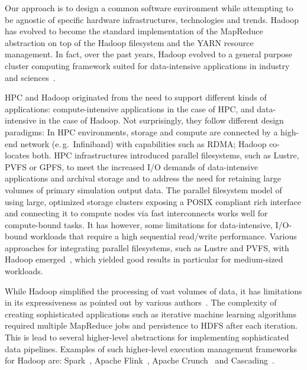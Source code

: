 \label{sec:pilot-data-hadoop}
Our approach is to design a common software environment while attempting to be agnostic of specific hardware infrastructures, technologies and trends.
Hadoop~\cite{hadoop} has evolved to become the standard implementation of the MapReduce abstraction on top of the Hadoop filesystem and the YARN resource management.
In fact, over the past years, Hadoop evolved to a general purpose cluster computing framework suited for data-intensive applications in industry~\cite{luckow2015automotive} and sciences~\cite{jha2014tale}.

HPC and Hadoop originated from the need to support different kinds of applications: compute-intensive applications in the case of HPC, and data-intensive in the case of Hadoop.
Not surprisingly, they follow different design paradigms: In HPC environments, storage and compute are connected by a high-end network (e.\,g.\ Infiniband) with capabilities such as RDMA; Hadoop co-locates both.
HPC infrastructures introduced parallel filesystems, such as Lustre, PVFS or GPFS, to meet the increased I/O demands of data-intensive applications and archival storage and to address the need for retaining large volumes of primary simulation output data.
The parallel filesystem model of using large, optimized storage clusters exposing a POSIX compliant rich interface and connecting it to compute nodes via fast interconnects works well for compute-bound tasks.
It has however, some limitations for data-intensive, I/O-bound workloads that require a high sequential read/write performance.
Various approaches for integrating parallel filesystems, such as Lustre and PVFS, with Hadoop emerged~\cite{kulkarni2013hadoop,tantisiriroj2011duality}, which yielded good results in particular for medium-sized workloads.

While Hadoop simplified the processing of vast volumes of data, it has limitations in its expressiveness as pointed out by various authors~\cite{yelick2011magellan,isard2007dryad}.
The complexity of creating sophisticated applications such as iterative machine learning algorithms required multiple MapReduce jobs and persistence to HDFS after each iteration.
This is lead to several higher-level abstractions for implementing sophisticated data pipelines.
Examples of such higher-level execution management frameworks for Hadoop are: Spark~\cite{zaharia2010spark}, Apache Flink~\cite{flink}, Apache Crunch~\cite{crunch} and Cascading~\cite{cascading}.

